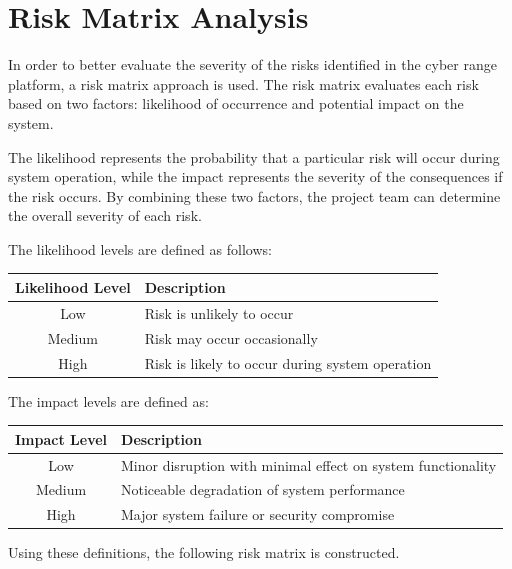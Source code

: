 \section{Risk Matrix Analysis}
In order to better evaluate the severity of the risks identified in the cyber range platform, a risk matrix approach is used. The risk matrix evaluates each risk based on two factors: likelihood of occurrence and potential impact on the system.

The likelihood represents the probability that a particular risk will occur during system operation, while the impact represents the severity of the consequences if the risk occurs. By combining these two factors, the project team can determine the overall severity of each risk.

The likelihood levels are defined as follows:

\begin{table}[H]
    \centering
    \renewcommand{\arraystretch}{1.2}
    \begin{tabularx}{\textwidth}{|c|X|}
        \hline
        \textbf{Likelihood Level} & \textbf{Description} \\
        \hline
        Low & Risk is unlikely to occur \\
        \hline
        Medium & Risk may occur occasionally \\
        \hline
        High & Risk is likely to occur during system operation \\
        \hline
    \end{tabularx}
\end{table}

The impact levels are defined as:

\begin{table}[H]
    \centering
    \renewcommand{\arraystretch}{1.2}
    \begin{tabularx}{\textwidth}{|c|X|}
        \hline
        \textbf{Impact Level} & \textbf{Description} \\
        \hline
        Low & Minor disruption with minimal effect on system functionality \\
        \hline
        Medium & Noticeable degradation of system performance \\
        \hline
        High & Major system failure or security compromise \\
        \hline
    \end{tabularx}
\end{table}

Using these definitions, the following risk matrix is constructed.

